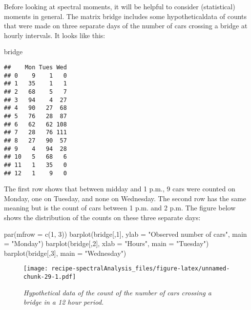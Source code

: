 \documentclass[
]{book}
\newenvironment{Shaded}{\begin{snugshade}}{\end{snugshade}}
\newcommand{\AttributeTok}[1]{\textcolor[rgb]{0.77,0.63,0.00}{#1}}
\newcommand{\DecValTok}[1]{\textcolor[rgb]{0.00,0.00,0.81}{#1}}
\newcommand{\FunctionTok}[1]{\textcolor[rgb]{0.00,0.00,0.00}{#1}}
\newcommand{\NormalTok}[1]{#1}
\newcommand{\StringTok}[1]{\textcolor[rgb]{0.31,0.60,0.02}{#1}}
\begin{document}
Before looking at spectral moments, it will be helpful to consider
(statistical) moments in general. The matrix bridge includes some hypotheticaldata of counts that were made on three separate days of the number of cars crossing a bridge at hourly intervals. It looks like this:

\begin{Shaded}
\begin{Highlighting}[]
\NormalTok{bridge}
\end{Highlighting}
\end{Shaded}

\begin{verbatim}
##    Mon Tues Wed
## 0    9    1   0
## 1   35    1   1
## 2   68    5   7
## 3   94    4  27
## 4   90   27  68
## 5   76   28  87
## 6   62   62 108
## 7   28   76 111
## 8   27   90  57
## 9    4   94  28
## 10   5   68   6
## 11   1   35   0
## 12   1    9   0
\end{verbatim}

The first row shows that between midday and 1 p.m., 9 cars were counted on
Monday, one on Tuesday, and none on Wednesday. The second row has the same
meaning but is the count of cars between 1 p.m. and 2 p.m. The figure below shows the distribution of the counts on these three separate days:

\begin{Shaded}
\begin{Highlighting}[]
\FunctionTok{par}\NormalTok{(}\AttributeTok{mfrow =} \FunctionTok{c}\NormalTok{(}\DecValTok{1}\NormalTok{, }\DecValTok{3}\NormalTok{)) }
\FunctionTok{barplot}\NormalTok{(bridge[,}\DecValTok{1}\NormalTok{], }
        \AttributeTok{ylab =} \StringTok{"Observed number of cars"}\NormalTok{, }
        \AttributeTok{main =} \StringTok{"Monday"}\NormalTok{) }
\FunctionTok{barplot}\NormalTok{(bridge[,}\DecValTok{2}\NormalTok{], }
        \AttributeTok{xlab =} \StringTok{"Hours"}\NormalTok{,}
        \AttributeTok{main =} \StringTok{"Tuesday"}\NormalTok{) }
\FunctionTok{barplot}\NormalTok{(bridge[,}\DecValTok{3}\NormalTok{], }
        \AttributeTok{main =} \StringTok{"Wednesday"}\NormalTok{) }
\end{Highlighting}
\end{Shaded}

\begin{figure}
\centering
\texttt{[image: recipe-spectralAnalysis\_files/figure-latex/unnamed-chunk-29-1.pdf]}
\caption{\label{fig:unnamed-chunk-29}\emph{Hypothetical data of the count of the number of cars crossing a bridge in a 12 hour period.}}
\end{figure}
\end{document}

